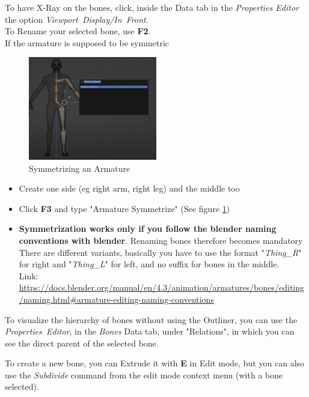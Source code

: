 \documentclass{article}
\begin{document}
To have X-Ray on the bones, click, inside the Data tab in the \textit{Properties Editor} the option \mbox{\textit{Viewport Display/In Front}}.\\
To Rename your selected bone, use \textbf{F2}.\\
If the armature is supposed to be symmetric
\begin{figure}
    \centering
    \label{symm::armature}
    \includegraphics[width=0.5\textwidth]{blender_docs_images/my_symmetric_armature.png}
    \caption{Symmetrizing an Armature}
\end{figure}
\begin{itemize}[noitemsep, topsep=0pt]
    \item Create one side (eg right arm, right leg) and the middle too
    \item Click \textbf{F3} and type "Armature Symmetrize" (See figure \ref{symm::armature})
    \item \textbf{Symmetrization works only if you follow the blender naming conventions with blender}. Renaming bones therefore becomes mandatory\\
    There are different variants, basically you have to use the format "\textit{Thing\_R}" for right and "\textit{Thing\_L}" for left, and no suffix for bones in the middle.\\
    Link: \href{https://docs.blender.org/manual/en/4.3/animation/armatures/bones/editing/naming.html\#armature-editing-naming-conventions}{https://docs.blender.org/manual/en/4.3/animation/armatures/bones/editing/naming.html\#armature-editing-naming-conventions}
\end{itemize}
To visualize the hierarchy of bones without using the Outliner, you can use the \mbox{\textit{Properties Editor}}, in the \textit{Bones} Data tab, under "Relations", in which you can see the direct
parent of the selected bone.\par
To create a new bone, you can Extrude it with \textbf{E} in Edit mode, but you can also use the \textit{Subdivide} command from the edit mode context menu (with a bone selected).
\end{document}
